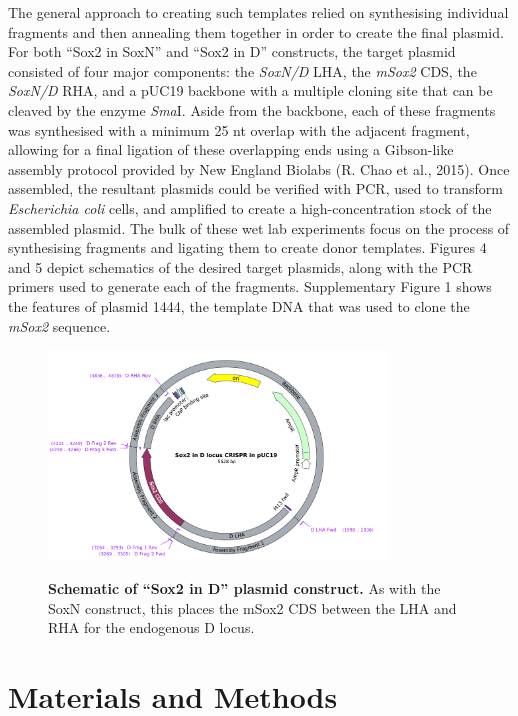 \documentclass[withindex,glossary]{cam-thesis}
\begin{document}
The general approach to creating such templates relied on synthesising
individual fragments and then annealing them together in order to create
the final plasmid. For both ``Sox2 in SoxN'' and ``Sox2 in D''
constructs, the target plasmid consisted of four major components: the
\emph{SoxN/D} LHA, the \emph{mSox2} CDS, the \emph{SoxN/D} RHA, and a
pUC19 backbone with a multiple cloning site that can be cleaved by the
enzyme \emph{Sma}I. Aside from the backbone, each of these fragments was
synthesised with a minimum 25 nt overlap with the adjacent fragment,
allowing for a final ligation of these overlapping ends using a
Gibson-like assembly protocol provided by New England Biolabs (R. Chao
et al., 2015). Once assembled, the resultant plasmids could be verified
with PCR, used to transform \emph{Escherichia coli} cells, and amplified
to create a high-concentration stock of the assembled plasmid. The bulk
of these wet lab experiments focus on the process of synthesising
fragments and ligating them to create donor templates. Figures 4 and 5
depict schematics of the desired target plasmids, along with the PCR
primers used to generate each of the fragments. Supplementary Figure 1
shows the features of plasmid 1444, the template DNA that was used to
clone the \emph{mSox2} sequence.

\setcounter{figure}{5-1}
\begin{figure}[htbp]
\centering
\includegraphics[width=0.8\textwidth]{Fig5_Sox2 in D locus CRISPR in pUC19 Map.pdf}
\label{fig5}
\caption{\textbf{Schematic of ``Sox2 in D'' plasmid construct.} As with the SoxN construct, this places the mSox2 CDS between the LHA and RHA for the endogenous D locus.}
\end{figure}

\section{Materials and Methods}
\end{document}
